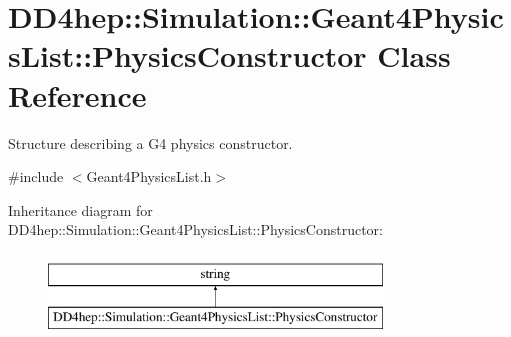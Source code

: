 \hypertarget{class_d_d4hep_1_1_simulation_1_1_geant4_physics_list_1_1_physics_constructor}{}\section{D\+D4hep\+:\+:Simulation\+:\+:Geant4\+Physics\+List\+:\+:Physics\+Constructor Class Reference}
\label{class_d_d4hep_1_1_simulation_1_1_geant4_physics_list_1_1_physics_constructor}


Structure describing a G4 physics constructor.  




{\ttfamily \#include $<$Geant4\+Physics\+List.\+h$>$}

Inheritance diagram for D\+D4hep\+:\+:Simulation\+:\+:Geant4\+Physics\+List\+:\+:Physics\+Constructor\+:\begin{figure}[H]
\begin{center}
\leavevmode
\includegraphics[height=2.000000cm]{class_d_d4hep_1_1_simulation_1_1_geant4_physics_list_1_1_physics_constructor}
\end{center}
\end{figure}
